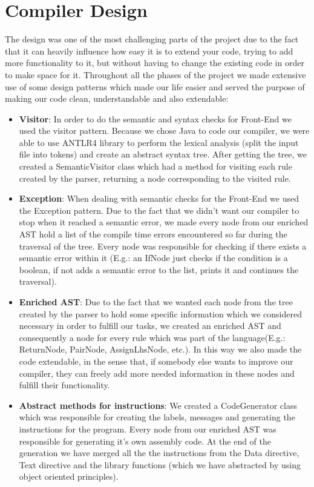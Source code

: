 \documentclass[11pt]{article}
\begin{document}
\section{Compiler Design}
\iffalse
THE DESIGN CHOICES(3/4)
1. An analysis of the design choices that you made during the WACC lab
2. Design patterns you used when designing your code and why you chose to use them.
\fi
The design was one of the most challenging parts of the project due to the fact that it can heavily influence how easy it is to extend your code, trying to add more functionality to it, but without having to change the existing code in order to make space for it. Throughout all the phases of the project we made extensive use of some design patterns which made our life easier and served the purpose of making our code clean, understandable and also extendable:
\begin{itemize}[noitemsep,topsep=0pt]
  \item \textbf{Visitor}:
    In order to do the semantic and syntax checks for Front-End we used the visitor pattern. Because we chose Java to code our compiler, we were able to use ANTLR4 library to perform the lexical analysis (split the input file into tokens) and create an abstract syntax tree. After getting the tree, we created a SemanticVisitor class which had a method for visiting each rule created by the parser, returning a node corresponding to the visited rule.
  \item \textbf{Exception}:
    When dealing with semantic checks for the Front-End we used the Exception pattern. Due to the fact that we didn't want our compiler to stop when it reached a semantic error, we made every node from our enriched AST hold a list of the compile time errors encountered so far during the traversal of the tree. Every node was responsible for checking if there exists a semantic error within it (E.g.: an IfNode just checks if the condition is a boolean, if not adds a semantic error to the list, prints it and continues the traversal).
  \item \textbf{Enriched AST}:
    Due to the fact that we wanted each node from the tree created by the parser to hold some specific information which we considered necessary in order to fulfill our tasks, we created an enriched AST and consequently a node for every rule which was part of the language(E.g.: ReturnNode, PairNode, AssignLhsNode, etc.). In this way we also made the code extendable, in the sense that, if somebody else wants to improve our compiler, they can freely add more needed information in these nodes and fulfill their functionality.
  \item \textbf{Abstract methods for instructions}: We created a CodeGenerator class which was responsible for creating the labels, messages and generating the instructions for the program. Every node from our enriched AST was responsible for generating it's own assembly code. At the end of the generation we have merged all the the instructions from the Data directive, Text directive and the library functions (which we have abstracted by using object oriented principles).
\end{itemize}
\end{document}
